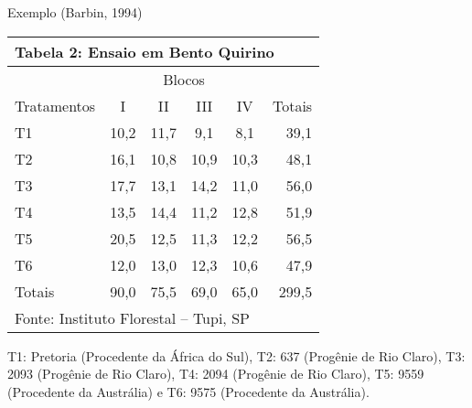 \documentclass[
  ignorenonframetext,
]{beamer}
\begin{document}
\begin{frame}{Exemplo (Barbin, 1994)}
\protect\hypertarget{exemplo-barbin-1994-1}{}
\begin{center}
\begin{tabular}{lccccr} 
\multicolumn{6}{l}{Tabela 2: Ensaio em Bento Quirino}\\ \hline
 & \multicolumn{4}{c}{Blocos} & \\ \cline{2-5}
Tratamentos &   I & II &    III &   IV  & Totais \\ \hline
T1 &    10,2 &  11,7 &  9,1 &   8,1 & 39,1 \\
T2 &    16,1 &  10,8 &  10,9 &  10,3 &  48,1 \\ 
T3 &    17,7 &  13,1 &  14,2 &  11,0 &  56,0\\
T4 &    13,5 &  14,4 &  11,2 &  12,8 &  51,9\\
T5 &    20,5 &  12,5 &  11,3 &  12,2 &  56,5\\
T6 &    12,0 &  13,0 &  12,3 &  10,6 &  47,9\\ \hline
Totais  &   90,0 &  75,5 &  69,0 &  65,0 &  299,5 \\ \hline
\multicolumn{6}{l}{Fonte: Instituto Florestal – Tupi, SP}\\
\end{tabular}
\end{center}

T1: Pretoria (Procedente da África do Sul), T2: 637 (Progênie de Rio
Claro), T3: 2093 (Progênie de Rio Claro), T4: 2094 (Progênie de Rio
Claro), T5: 9559 (Procedente da Austrália) e T6: 9575 (Procedente da
Austrália).
\end{frame}
\end{document}
